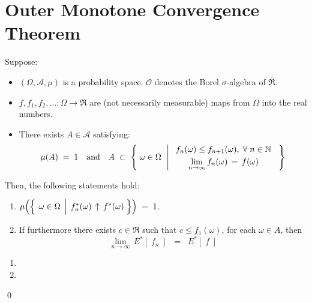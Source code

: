 

\section{Outer Monotone Convergence Theorem}
\setcounter{theorem}{0}
\setcounter{equation}{0}


\renewcommand{\theenumi}{\roman{enumi}}
\renewcommand{\labelenumi}{\textnormal{(\theenumi)}$\;\;$}


\begin{theorem}
\mbox{}\vskip 0.1cm
\noindent
Suppose:
\begin{itemize}
\item
	$(\Omega,\mathcal{A},\mu)$ is a probability space.
	$\mathcal{O}$ denotes the Borel $\sigma$-algebra of $\overline{\Re}$.
\item
	$f, f_{1}, f_{2}, \ldots : \Omega \longrightarrow \Re$ are (not necessarily measurable)
	maps from $\Omega$ into the real numbers.
\item
	There exists $A \in \mathcal{A}$
	satisfying:
	\begin{equation*}
	\mu(A) \;=\; 1
	\quad\textnormal{and}\quad
	A \;\subset\;\left\{\;
		\omega \overset{{\color{white}.}}{\in} \Omega
		\,\;\left\vert\;
		\begin{array}{c}
			f_{n}(\omega) \leq f_{n+1}(\omega),\;\forall\;n\in\N
			\\
			\underset{n\rightarrow\infty}{\lim}\,f_{n}(\omega) \,\overset{{\color{white}+}}{=}\, f(\omega)
		\end{array}
		\right.
		\;\right\}
	\end{equation*}
\end{itemize}
Then, the following statements hold:
\begin{enumerate}
\item
	$\mu\!\left(\left\{\;
			\left.
			\omega \overset{{\color{white}.}}{\in} \Omega
			\,\;\right\vert\;
			f^{*}_{n}(\omega) \,\uparrow\, f^{*}(\omega)
			\;\right\}\right)
	\; = \; 1$.
\item
	If furthermore there exists $c \in \Re$ such that $c \leq f_{1}(\omega)$, for each $\omega \in A$, then
	\begin{equation*}
	\underset{n\rightarrow\infty}{\lim}\,E^{*}\!\left[\;f_{n}\;\right]
	\;\; = \;\; E^{*}\!\left[\;f\;\right]
	\end{equation*}
\end{enumerate}
\end{theorem}
\proof
\begin{enumerate}
\item
\item
\end{enumerate}
\qed



\renewcommand{\theenumi}{\roman{enumi}}
\renewcommand{\labelenumi}{\textnormal{(\theenumi)}$\;\;$}

